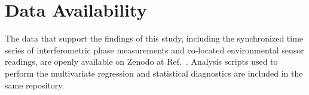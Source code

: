 \documentclass[aps,prapplied,reprint,groupedaddress,twocolumn,superscriptaddress,linenumbers]{revtex4-2}
\begin{document}
\section*{Data Availability}
The data that support the findings of this study, including the synchronized time series of interferometric phase measurements and co-located environmental sensor readings, are openly available on Zenodo at Ref.~\cite{wu_2026_18800166}. Analysis scripts used to perform the multivariate regression and statistical diagnostics are included in the same repository.


\end{document}
